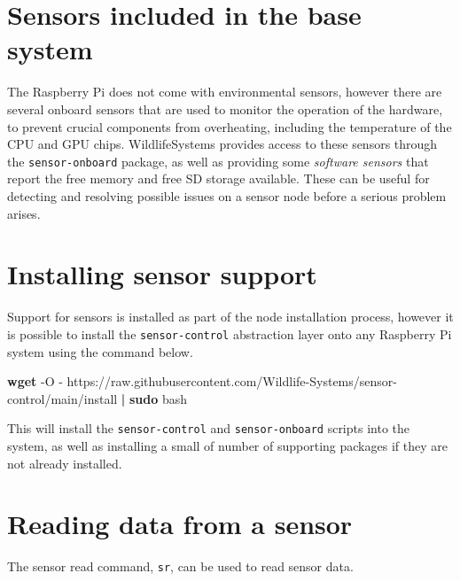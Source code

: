 \documentclass[
]{book}
\newenvironment{Shaded}{\begin{snugshade}}{\end{snugshade}}
\newcommand{\AttributeTok}[1]{\textcolor[rgb]{0.13,0.29,0.53}{#1}}
\newcommand{\FunctionTok}[1]{\textcolor[rgb]{0.13,0.29,0.53}{\textbf{#1}}}
\newcommand{\KeywordTok}[1]{\textcolor[rgb]{0.13,0.29,0.53}{\textbf{#1}}}
\newcommand{\NormalTok}[1]{#1}
\begin{document}
\hypertarget{sensors-included-in-the-base-system}{%
\section{Sensors included in the base system}\label{sensors-included-in-the-base-system}}

The Raspberry Pi does not come with environmental sensors, however there are several onboard sensors that are used to monitor the operation of the hardware, to prevent crucial components from overheating, including the temperature of the CPU and GPU chips. WildlifeSystems provides access to these sensors through the \texttt{sensor-onboard} package, as well as providing some \emph{software sensors} that report the free memory and free SD storage available. These can be useful for detecting and resolving possible issues on a sensor node before a serious problem arises.

\hypertarget{installing-sensor-support}{%
\section{Installing sensor support}\label{installing-sensor-support}}

Support for sensors is installed as part of the node installation process, however it is possible to install the \texttt{sensor-control} abstraction layer onto any Raspberry Pi system using the command below.

\begin{Shaded}
\begin{Highlighting}[]
\FunctionTok{wget} \AttributeTok{{-}O} \AttributeTok{{-}}\NormalTok{ https://raw.githubusercontent.com/Wildlife{-}Systems/sensor{-}control/main/install }\KeywordTok{|} \FunctionTok{sudo}\NormalTok{ bash}
\end{Highlighting}
\end{Shaded}

This will install the \texttt{sensor-control} and \texttt{sensor-onboard} scripts into the system, as well as installing a small of number of supporting packages if they are not already installed.

\hypertarget{reading-data-from-a-sensor}{%
\section{Reading data from a sensor}\label{reading-data-from-a-sensor}}

The sensor read command, \texttt{sr}, can be used to read sensor data.
\end{document}
